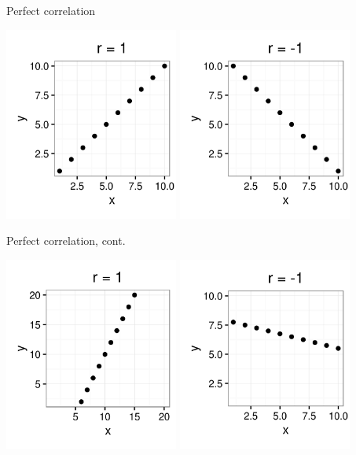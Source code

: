 \documentclass[xcolor=table, aspectratio=169, bigger, handout]{beamer}
\begin{document}
\begin{frame}{Perfect correlation}

{\centering
\includegraphics[width=2.25in]{../images/ch10_cor_pos1}
\includegraphics[width=2.25in]{../images/ch10_cor_neg1}
\par}
\end{frame}

\begin{frame}{Perfect correlation, cont.}

{\centering
\includegraphics[width=2.25in]{../images/ch10_cor_pos2}
\includegraphics[width=2.25in]{../images/ch10_cor_neg2}
\par}
\end{frame}
\end{document}
